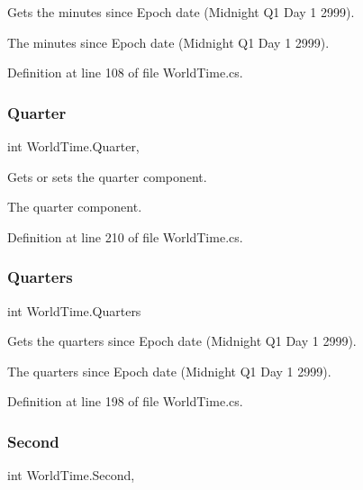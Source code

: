 Gets the minutes since Epoch date (Midnight Q1 Day 1 2999). 

The minutes since Epoch date (Midnight Q1 Day 1 2999).

Definition at line 108 of file World\+Time.\+cs.

\mbox{\label{struct_world_time_aa57cb1c36848da0bfb42629fde45222d}} 
\subsubsection{\texorpdfstring{Quarter}{Quarter}}
{\footnotesize\ttfamily int World\+Time.\+Quarter\hspace{0.3cm}{\ttfamily [get]}, {\ttfamily [set]}}



Gets or sets the quarter component. 

The quarter component.

Definition at line 210 of file World\+Time.\+cs.

\mbox{\label{struct_world_time_aa6543f028b3054c16b1bd4f1e27ed17d}} 
\subsubsection{\texorpdfstring{Quarters}{Quarters}}
{\footnotesize\ttfamily int World\+Time.\+Quarters\hspace{0.3cm}{\ttfamily [get]}}



Gets the quarters since Epoch date (Midnight Q1 Day 1 2999). 

The quarters since Epoch date (Midnight Q1 Day 1 2999).

Definition at line 198 of file World\+Time.\+cs.

\mbox{\label{struct_world_time_a8a8b0a51575031bde059612c3ce77dfc}} 
\subsubsection{\texorpdfstring{Second}{Second}}
{\footnotesize\ttfamily int World\+Time.\+Second\hspace{0.3cm}{\ttfamily [get]}, {\ttfamily [set]}}



